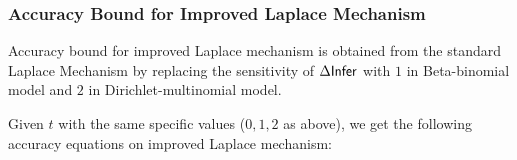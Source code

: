 \documentclass{article}
\begin{document}
\subsubsection{Accuracy Bound for Improved Laplace Mechanism}
\label{subsec_accuracy_lap}
Accuracy bound for improved Laplace mechanism is obtained from the standard Laplace Mechanism by replacing the sensitivity of $\Delta \mathsf{Infer}$ with $1$ in Beta-binomial model and $2$ in Dirichlet-multinomial model.

Given $t$ with the same specific values ($0,1,2$ as above), we get the following accuracy equations on improved Laplace mechanism:
%
%
%
\end{document}
